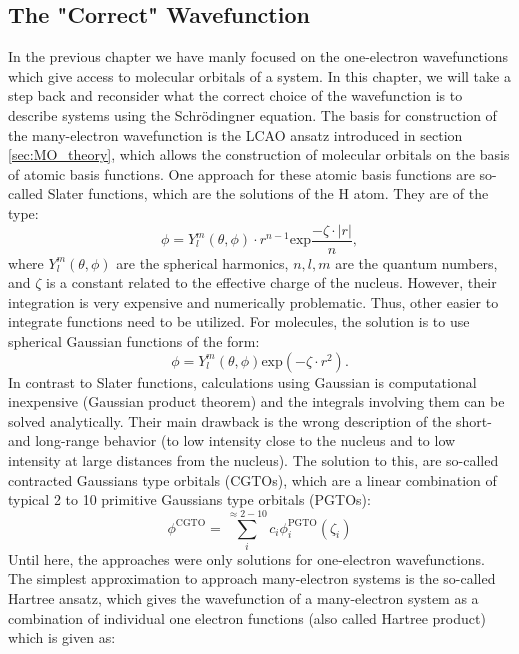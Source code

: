 \subsection{The "Correct" Wavefunction}
In the previous chapter we have manly focused on the one-electron wavefunctions which give access to molecular orbitals of a system. In this chapter, we will take a step back and reconsider what the correct choice of the wavefunction is to describe systems using the Schr\"odingner equation. The basis for construction of the many-electron wavefunction is the LCAO ansatz introduced in section \ref{sec:MO_theory}, which allows the construction of molecular orbitals on the basis of atomic basis functions. One approach for these atomic basis functions are so-called Slater functions, which are the solutions of the H atom. They are of the type:
\begin{equation}
   \phi = Y_{l}^{m}(\theta, \phi) \cdot r^{n-1}\mathrm{exp}\frac{-\zeta\cdot |r|}{n},
    \label{eq:Slater_function}
\end{equation}
where $Y_{l}^{m}(\theta, \phi)$ are the spherical harmonics, $n, l, m$ are the quantum numbers, and $\zeta$ is a constant related to the effective charge of the nucleus. However, their integration is very expensive and numerically problematic. Thus, other easier to integrate functions need to be utilized. For molecules, the solution is to use spherical Gaussian functions of the form:
\begin{equation}
   \phi = Y_{l}^{m}(\theta, \phi) \mathrm{exp}(-\zeta\cdot r^2).
    \label{eq:spherical_Gaussian_function}
\end{equation}
In contrast to Slater functions, calculations using Gaussian is computational inexpensive (Gaussian product theorem) and the integrals involving them can be solved analytically. Their main drawback is the wrong description of the short- and long-range behavior (to low intensity close to the nucleus and to low intensity at large distances from the nucleus). The solution to this, are so-called contracted Gaussians type orbitals (CGTOs), which are a linear combination of typical 2 to 10 primitive Gaussians type orbitals (PGTOs):
\begin{equation}
   \phi^{\mathrm{CGTO}} = \sum_{i}^{\approx2-10} c_{i}\phi_{i}^{\mathrm{PGTO}}(\zeta_{i})
    \label{eq:contracted_Gaussians}
\end{equation}
Until here, the approaches were only solutions for one-electron wavefunctions. The simplest approximation to approach many-electron systems is the so-called Hartree ansatz, which gives the wavefunction of a many-electron system as a combination of individual one electron functions (also called Hartree product) which is given as:
